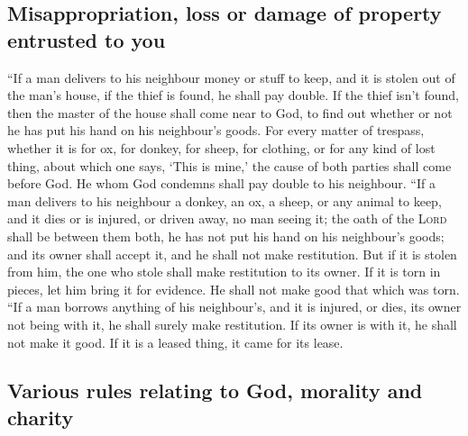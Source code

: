 \hypertarget{misappropriation-loss-or-damage-of-property-entrusted-to-you}{%
\subsection{Misappropriation, loss or damage of property entrusted to
you}\label{misappropriation-loss-or-damage-of-property-entrusted-to-you}}

 ``If a man delivers to his neighbour money or stuff to
keep, and it is stolen out of the man's house, if the thief is found, he
shall pay double.  If the thief isn't found, then the
master of the house shall come near to God, to find out whether or not
he has put his hand on his neighbour's goods.  For every
matter of trespass, whether it is for ox, for donkey, for sheep, for
clothing, or for any kind of lost thing, about which one says, `This is
mine,' the cause of both parties shall come before God. He whom God
condemns shall pay double to his neighbour.  ``If a man
delivers to his neighbour a donkey, an ox, a sheep, or any animal to
keep, and it dies or is injured, or driven away, no man seeing it;
 the oath of the \textsc{Lord} shall be between them
both, he has not put his hand on his neighbour's goods; and its owner
shall accept it, and he shall not make restitution.  But
if it is stolen from him, the one who stole shall make restitution to
its owner.  If it is torn in pieces, let him bring it for
evidence. He shall not make good that which was torn. 
``If a man borrows anything of his neighbour's, and it is injured, or
dies, its owner not being with it, he shall surely make restitution.
 If its owner is with it, he shall not make it good. If
it is a leased thing, it came for its lease.

\hypertarget{various-rules-relating-to-god-morality-and-charity}{%
\subsection{Various rules relating to God, morality and
charity}\label{various-rules-relating-to-god-morality-and-charity}}

